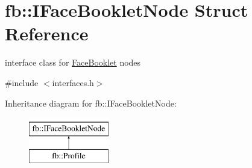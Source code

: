 \hypertarget{structfb_1_1_i_face_booklet_node}{\section{fb\+:\+:I\+Face\+Booklet\+Node Struct Reference}
\label{structfb_1_1_i_face_booklet_node}
}


interface class for \hyperlink{classfb_1_1_face_booklet}{Face\+Booklet} nodes  




{\ttfamily \#include $<$interfaces.\+h$>$}

Inheritance diagram for fb\+:\+:I\+Face\+Booklet\+Node\+:\begin{figure}[H]
\begin{center}
\leavevmode
\includegraphics[height=2.000000cm]{structfb_1_1_i_face_booklet_node}
\end{center}
\end{figure}
